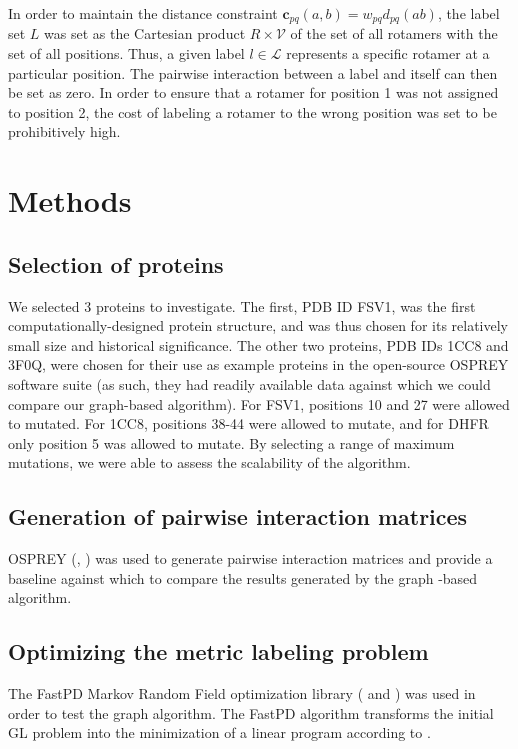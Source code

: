 \documentclass[11pt]{article}
\begin{document}
	In order to maintain the distance constraint 
	$\textbf{c}_{pq}(a,b) =  w_{pq}d_{pq}(ab)$, the label set $L$ was set as the
	Cartesian product $R \times \mathcal{V}$ of the set of all rotamers with the set
	of all positions. Thus, a given label $l \in \mathcal{L}$ represents a specific
	rotamer at a particular position. The pairwise interaction between a label and
	itself can then be set as zero. In order to ensure that a rotamer for position 1
	was not assigned to position 2, the cost of labeling a rotamer to the wrong
	position was set to be prohibitively high. 
	
	\section{Methods}
	
	\subsection{Selection of proteins}
	We selected 3 proteins to investigate. The first, PDB ID FSV1, was the first
	computationally-designed protein structure, and was thus chosen for its relatively
	small size and historical significance. The other two proteins, PDB IDs 1CC8 and
	3F0Q, were chosen for their use as example proteins in the open-source OSPREY
	software suite (as such, they had readily available data against which we could
	compare our graph-based algorithm). For FSV1, positions 10 and 27 were allowed to
	mutated.  For 1CC8, positions 38-44 were allowed to mutate, and for DHFR only
	position 5 was allowed to mutate.  By selecting a range of maximum mutations, we
	were able to assess the scalability of the algorithm.
	
	\subsection{Generation of pairwise interaction matrices}
	OSPREY (\cite{OS1}, \cite{OS2}) was used to generate pairwise interaction matrices
	and provide a baseline against which to compare the results generated by the graph
	-based algorithm.
	
	\subsection{Optimizing the metric labeling problem}
	The FastPD Markov Random Field optimization library 
	(\cite{Karmarkar} and \cite{Komodakis}) was used in order to test the graph
	algorithm. The FastPD algorithm transforms the initial GL problem into the
	minimization of a linear program according to \cite{CKNZ}. 
	
\end{document}
